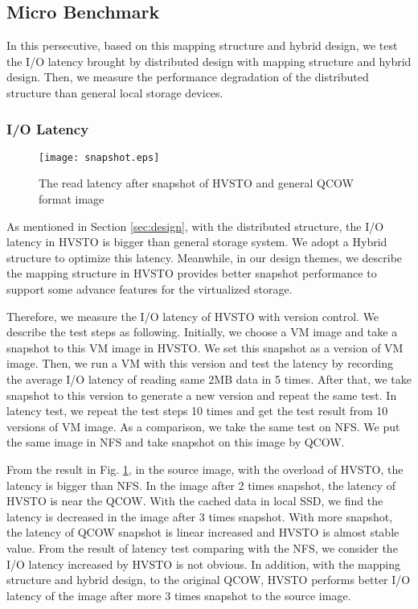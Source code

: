 \documentclass[conference]{IEEEtran}
\begin{document}
\subsection{Micro Benchmark}
In this persecutive, based on this mapping structure and hybrid design, we test the I/O latency brought by distributed design with mapping structure and hybrid design. Then, we measure the performance degradation of the distributed structure than general local storage devices. 

\subsubsection{I/O Latency}
\begin{figure}[!ht]
\centering
\texttt{[image: snapshot.eps]}
\caption{The read latency after snapshot of HVSTO and general QCOW format image}
\label{figure:snapshot}
\end{figure}

As mentioned in Section \ref{sec:design}, with the distributed structure, the I/O latency in HVSTO is bigger than general storage system. We adopt a Hybrid structure to optimize this latency. Meanwhile, in our design themes, we describe the mapping structure in HVSTO provides better snapshot performance to support some advance features for the virtualized storage. 

Therefore, we measure the I/O latency of HVSTO with version control. We describe the test steps as following. Initially, we choose a VM image and take a snapshot to this VM image in HVSTO. We set this snapshot as a version of VM image. Then, we run a VM with this version and test the latency by recording the average I/O latency of reading same 2MB data in 5 times. After that, we take snapshot to this version to generate a new version and repeat the same test. In latency test, we repeat the test steps 10 times and get the test result from 10 versions of VM image. As a comparison, we take the same test on NFS. We put the same image in NFS and take snapshot on this image by QCOW.

From the result in Fig. \ref{figure:snapshot}, in the source image, with the overload of HVSTO, the latency is bigger than NFS. In the image after 2 times snapshot, the latency of HVSTO is near the QCOW. With the cached data in local SSD, we find the latency is decreased in the image after 3 times snapshot. With more snapshot, the latency of QCOW snapshot is linear increased and HVSTO is almost stable value. From the result of latency test comparing with the NFS, we consider the I/O latency increased by HVSTO is not obvious. In addition, with the mapping structure and hybrid design, to the original QCOW, HVSTO performs better I/O latency of the image after more 3 times snapshot to the source image.
\end{document}
